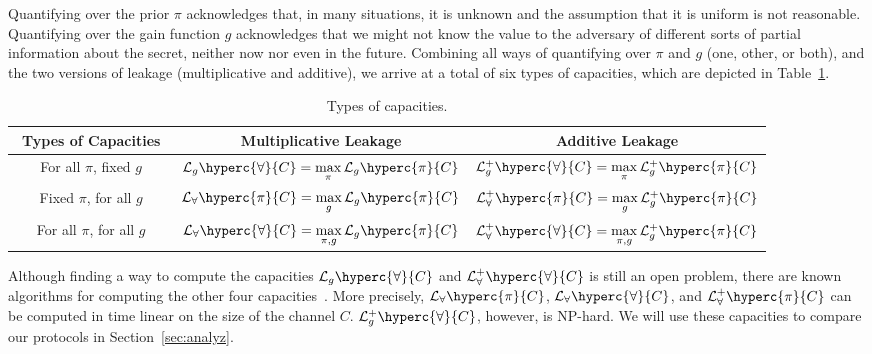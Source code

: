 Quantifying over the prior $\pi$ acknowledges that, in many situations,
it is unknown and the assumption that it is uniform is not reasonable. 
Quantifying over the gain function $g$ acknowledges that we might not know 
the value to the adversary of different sorts of partial information about 
the secret, neither now nor even in the future. 
Combining all ways of quantifying over $\pi$ and $g$ (one, other, or both),
and the two versions of leakage (multiplicative and additive), 
we arrive at a total of six 
types of capacities, which are depicted in Table~\ref{tab:capacities}.

\begin{table}[htb]
\centering
\renewcommand{\arraystretch}{1.5}
\begin{tabular}{|c||c|c|}
\hline
\textbf{\,\,\,Types of Capacities\,\,\,} & \,\,\,\,\,\,\,Multiplicative Leakage\,\,\,\,\,\,\, & \,\,\,\,\,\,\,\,\,\,\,\,\,\,\,Additive Leakage\,\,\,\,\,\,\,\,\,\,\,\,\,\,\,
\\ \hline \hline
For all $\pi$, fixed $g$ 
& $\mathcal{L}_g\hyperc{\forall}{C}=\max\limits_{\pi} \mathcal{L}_g\hyperc{\pi}{C}$ 
& $\mathcal{L}^+_g\hyperc{\forall}{C}=\max\limits_{\pi} \mathcal{L}^+_g\hyperc{\pi}{C}$ 
\\ \hline
Fixed $\pi$, for all $g$ 
& $\mathcal{L}_\forall\hyperc{\pi}{C}=\max\limits_{g} \mathcal{L}_g\hyperc{\pi}{C}$
& $\mathcal{L}^+_\forall\hyperc{\pi}{C}=\max\limits_{g} \mathcal{L}^+_g\hyperc{\pi}{C}$ 
\\ \hline
For all $\pi$, for all $g$ 
& $\mathcal{L}_\forall\hyperc{\forall}{C}=\max\limits_{\pi,g} \mathcal{L}_g\hyperc{\pi}{C}$ 
& $\mathcal{L}^+_\forall\hyperc{\forall}{C}=\max\limits_{\pi,g} \mathcal{L}^+_g\hyperc{\pi}{C}$
\\ \hline
\end{tabular}
\renewcommand{\arraystretch}{1}
\vspace{2mm}
\caption{Types of capacities.}
\label{tab:capacities}
\end{table}

Although finding a way to compute the capacities
$\mathcal{L}_g\hyperc{\forall}{C}$ and $\mathcal{L}^+_\forall\hyperc{\forall}{C}$
is still an open problem, there are known algorithms for computing the other 
four capacities~\cite{addmult}.
More precisely, $\mathcal{L}_\forall\hyperc{\pi}{C}$, 
$\mathcal{L}_\forall\hyperc{\forall}{C}$, and 
$\mathcal{L}^+_\forall\hyperc{\pi}{C}$ can be computed in time linear on the size 
of the channel $C$. 
$\mathcal{L}^+_g\hyperc{\forall}{C}$, however, is NP-hard. 
We will use these capacities to compare our protocols in Section~\ref{sec:analyz}.

